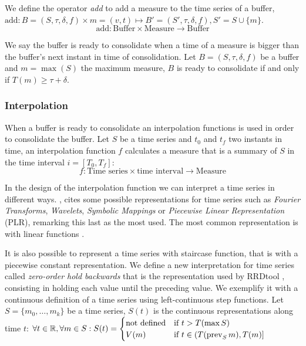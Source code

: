 We define the operator \emph{add} to add a measure to the time series
of a buffer, 
$\text{add}:
B = (S,\tau,\delta,f) \times m = (v,t) \mapsto B'=
(S',\tau,\delta,f), S' = S \cup \{m\}
$.
\[
\text{add}: \text{Buffer} \times \text{Measure} \longrightarrow \text{Buffer}
\]



We say the buffer is ready to consolidate when a time of a measure is
bigger than the buffer's next instant in time of consolidation.  Let
$B=(S,\tau,\delta,f)$ be a buffer and $m=\max(S)$ the maximum measure,
$B$ is ready to consolidate if and only if $T(m) \geq \tau+\delta$.


\subsubsection{Interpolation}

When a buffer is ready to consolidate an interpolation functions is
used in order to consolidate the buffer.  Let $S$ be a time series and
$t_0$ and $t_f$ two instants in time, an interpolation function $f$
calculates a measure that is a summary of $S$ in the time interval
$i=[T_0,T_f]$:
\[
f: \text{Time series} \times \text{time interval} \longrightarrow
\text{Measure}
\]


In the design of the interpolation function we can interpret a time
series in different ways. \cite{last:keogh}, cites
some possible representations for time series such as \emph{Fourier
  Transforms}, \emph{Wavelets}, \emph{Symbolic Mappings} or
\emph{Piecewise Linear Representation} (PLR), remarking this last as
the most used. The most common representation is with linear
functions \cite{keogh01}.

It is also possible to represent a time series with staircase
function, that is with a piecewise constant representation.  We define
a new interpretation for time series called \emph{zero-order hold
  backwards} that is the representation used by RRDtool
\cite{lisa98:oetiker}, consisting in holding each value until the
preceding value. We exemplify it with a continuous definition of a
time series using left-continuous step functions.  Let
$S=\{m_0,\ldots,m_k\}$ be a time series, $S(t)$ is the continuous
representations along time $t$:
$
\forall t \in \mathbb{R}  ,\forall m \in S:
S(t) =  
\begin{cases}
  \text{not defined} & \text{if } t > T(\max S) \\
  V(m) & \text{if }  t\in (T(\operatorname*{prev}_S m),T(m)]
\end{cases}
$



